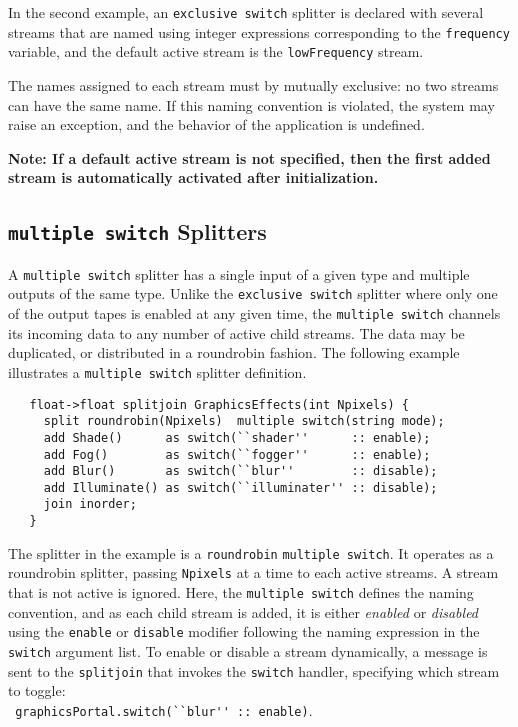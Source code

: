 \documentclass{tr}
\begin{document}
In  the  second  example,  an \texttt{exclusive  switch}  splitter  is
declared with several streams that are named using integer expressions
corresponding to the \verb+frequency+ variable, and the default active
stream is the  \verb+lowFrequency+ stream. 

The names assigned  to each stream must by  mutually exclusive: no two
streams can have the same name. If this naming convention is violated,
the system may raise an exception, and the behavior of the application
is undefined.

{\bf Note: If a default active stream is not specified, then the first
added stream is automatically activated after initialization.}



\subsection {\texttt{multiple switch} Splitters}

A \texttt{multiple switch} splitter has a single input of a given type
and multiple  outputs of the  same type. Unlike  the \texttt{exclusive
switch} splitter where only one of  the output tapes is enabled at any
given time, the \texttt{multiple switch} channels its incoming data to
any number  of active  child streams. The  data may be  duplicated, or
distributed   in  a   roundrobin  fashion.    The   following  example
illustrates a \texttt{multiple switch} splitter definition.
\begin{verbatim}
   float->float splitjoin GraphicsEffects(int Npixels) {
     split roundrobin(Npixels)  multiple switch(string mode);
     add Shade()      as switch(``shader''      :: enable);
     add Fog()        as switch(``fogger''      :: enable);
     add Blur()       as switch(``blur''        :: disable);
     add Illuminate() as switch(``illuminater'' :: disable);
     join inorder;
   }
\end{verbatim}

The splitter in the  example is a \texttt{roundrobin} \texttt{multiple
switch}.  It operates as a roundrobin splitter, passing \verb+Npixels+
at  a time to  each active  streams. A  stream that  is not  active is
ignored.  Here,  the   \texttt{multiple  switch}  defines  the  naming
convention,  and as  each child  stream is  added, it  is  either {\it
enabled} or  {\it disabled} using the  \verb+enable+ or \verb+disable+
modifier  following  the  naming  expression  in  the  \texttt{switch}
argument list. To enable or disable a stream dynamically, a message is
sent to the \verb+splitjoin+ that invokes the \texttt{switch} handler,
specifying          which         stream          to         toggle:\\
\verb+ graphicsPortal.switch(``blur'' :: enable)+.
\end{document}
